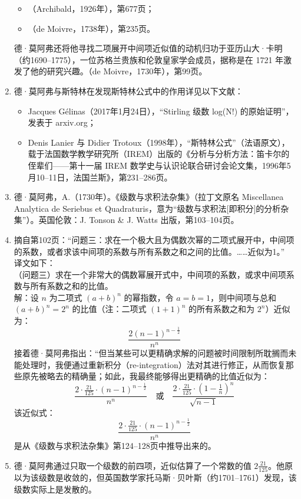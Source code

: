 \begin{enumerate}
\begin{itemize}
\item （Archibald，1926年），第677页；
\item （de Moivre，1738年），第235页。
\end{itemize}
德·莫阿弗还将他寻找二项展开中间项近似值的动机归功于亚历山大·卡明（约1690–1775），一位苏格兰贵族和伦敦皇家学会成员，据称是在 1721 年激发了他的研究兴趣。（de Moivre，1730年），第99页。
\item 德·莫阿弗与斯特林在发现斯特林公式中的作用详见以下文献：
\begin{itemize}
\item Jacques Gélinas（2017年1月24日），“Stirling 级数 log(N!) 的原始证明”，发表于 arxiv.org；
\item Denis Lanier 与 Didier Trotoux（1998年），“斯特林公式”（法语原文），载于法国数学教学研究所（IREM）出版的《分析与分析方法：笛卡尔的侄辈们——第十一届 IREM 数学史与认识论联合研讨会论文集，1996年5月10–11日，法国兰斯》，第231–286页。
\end{itemize}
\item 德·莫阿弗，A.（1730年）。《级数与求积法杂集》（拉丁文原名 Miscellanea Analytica de Seriebus et Quadraturis，意为“级数与求积法[即积分]的分析杂集”）。英国伦敦：J. Tonson & J. Watts 出版，第103–104页。
\item 摘自第102页：“问题三：求在一个极大且为偶数次幂的二项式展开中，中间项的系数，或者求该中间项的系数与所有系数之和之间的比值。……近似为1。”\\
译文如下：\\
（问题三）求在一个非常大的偶数幂展开式中，中间项的系数，或求中间项系数与所有系数之和的比值。\\
解：设 $n$ 为二项式 $(a + b)^n$ 的幂指数，令 $a = b = 1$，则中间项与总和 $(a + b)^n = 2^n$ 的比值（注：二项式 $(1 + 1)^n$ 的所有系数之和为 $2^n$）近似为：
$$
\frac{2(n - 1)^{n - \frac{1}{2}}}{n^n}~
$$
接着德·莫阿弗指出：“但当某些可以更精确求解的问题被时间限制所耽搁而未能处理时，我便通过重新积分（re-integration）法对其进行修正，从而恢复那些原先被略去的精确量；如此，我最终能够得出更精确的比值近似为：
$$
\frac{2 \cdot \frac{21}{125} \cdot (n - 1)^{n - \frac{1}{2}}}{n^n}
\quad \text{或} \quad
\frac{2 \cdot \frac{21}{125} \cdot \left(1 - \frac{1}{n}\right)^n}{\sqrt{n - 1}}~
$$
该近似式：
$$
\frac{2 \cdot \frac{21}{125} \cdot (n - 1)^{n - \frac{1}{2}}}{n^n}~
$$
是从《级数与求积法杂集》第124–128页中推导出来的。
\item 德·莫阿弗通过只取一个级数的前四项，近似估算了一个常数的值 $\displaystyle 2\frac{21}{125}$。他原以为该级数是收敛的，但英国数学家托马斯·贝叶斯（约1701–1761）发现，该级数实际上是发散的。\\

\end{enumerate}
